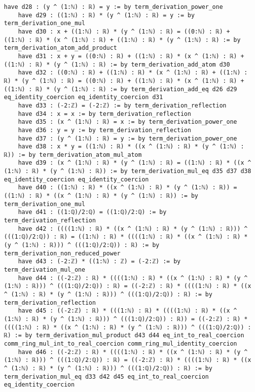 \documentclass{article}
\begin{document}
\begin{tcolorbox}[colback=white!10, width=\linewidth]
\begin{lstlisting}[language=Lean4]
    have d28 : (y ^ (1:ℕ) : ℝ) = y := by term_derivation_power_one
    have d29 : ((1:ℕ) : ℝ) * (y ^ (1:ℕ) : ℝ) = y := by term_derivation_one_mul
    have d30 : x + ((1:ℕ) : ℝ) * (y ^ (1:ℕ) : ℝ) = ((0:ℕ) : ℝ) + ((1:ℕ) : ℝ) * (x ^ (1:ℕ) : ℝ) + ((1:ℕ) : ℝ) * (y ^ (1:ℕ) : ℝ) := by term_derivation_atom_add_product
    have d31 : x + y = ((0:ℕ) : ℝ) + ((1:ℕ) : ℝ) * (x ^ (1:ℕ) : ℝ) + ((1:ℕ) : ℝ) * (y ^ (1:ℕ) : ℝ) := by term_derivation_add_atom d30
    have d32 : ((0:ℕ) : ℝ) + ((1:ℕ) : ℝ) * (x ^ (1:ℕ) : ℝ) + ((1:ℕ) : ℝ) * (y ^ (1:ℕ) : ℝ) = ((0:ℕ) : ℝ) + ((1:ℕ) : ℝ) * (x ^ (1:ℕ) : ℝ) + ((1:ℕ) : ℝ) * (y ^ (1:ℕ) : ℝ) := by term_derivation_add_eq d26 d29 eq_identity_coercion eq_identity_coercion d31
    have d33 : (-2:ℤ) = (-2:ℤ) := by term_derivation_reflection
    have d34 : x = x := by term_derivation_reflection
    have d35 : (x ^ (1:ℕ) : ℝ) = x := by term_derivation_power_one
    have d36 : y = y := by term_derivation_reflection
    have d37 : (y ^ (1:ℕ) : ℝ) = y := by term_derivation_power_one
    have d38 : x * y = ((1:ℕ) : ℝ) * ((x ^ (1:ℕ) : ℝ) * (y ^ (1:ℕ) : ℝ)) := by term_derivation_atom_mul_atom
    have d39 : (x ^ (1:ℕ) : ℝ) * (y ^ (1:ℕ) : ℝ) = ((1:ℕ) : ℝ) * ((x ^ (1:ℕ) : ℝ) * (y ^ (1:ℕ) : ℝ)) := by term_derivation_mul_eq d35 d37 d38 eq_identity_coercion eq_identity_coercion
    have d40 : ((1:ℕ) : ℝ) * ((x ^ (1:ℕ) : ℝ) * (y ^ (1:ℕ) : ℝ)) = ((1:ℕ) : ℝ) * ((x ^ (1:ℕ) : ℝ) * (y ^ (1:ℕ) : ℝ)) := by term_derivation_one_mul
    have d41 : ((1:ℚ)/2:ℚ) = ((1:ℚ)/2:ℚ) := by term_derivation_reflection
    have d42 : ((((1:ℕ) : ℝ) * ((x ^ (1:ℕ) : ℝ) * (y ^ (1:ℕ) : ℝ))) ^ (((1:ℚ)/2:ℚ)) : ℝ) = ((1:ℕ) : ℝ) * ((((1:ℕ) : ℝ) * ((x ^ (1:ℕ) : ℝ) * (y ^ (1:ℕ) : ℝ))) ^ (((1:ℚ)/2:ℚ)) : ℝ) := by term_derivation_non_reduced_power
    have d43 : (-2:ℤ) * ((1:ℕ) : ℤ) = (-2:ℤ) := by term_derivation_mul_one
    have d44 : ((-2:ℤ) : ℝ) * ((((1:ℕ) : ℝ) * ((x ^ (1:ℕ) : ℝ) * (y ^ (1:ℕ) : ℝ))) ^ (((1:ℚ)/2:ℚ)) : ℝ) = ((-2:ℤ) : ℝ) * ((((1:ℕ) : ℝ) * ((x ^ (1:ℕ) : ℝ) * (y ^ (1:ℕ) : ℝ))) ^ (((1:ℚ)/2:ℚ)) : ℝ) := by term_derivation_reflection
    have d45 : ((-2:ℤ) : ℝ) * (((1:ℕ) : ℝ) * ((((1:ℕ) : ℝ) * ((x ^ (1:ℕ) : ℝ) * (y ^ (1:ℕ) : ℝ))) ^ (((1:ℚ)/2:ℚ)) : ℝ)) = ((-2:ℤ) : ℝ) * ((((1:ℕ) : ℝ) * ((x ^ (1:ℕ) : ℝ) * (y ^ (1:ℕ) : ℝ))) ^ (((1:ℚ)/2:ℚ)) : ℝ) := by term_derivation_mul_product d43 d44 eq_int_to_real_coercion comm_ring_mul_int_to_real_coercion comm_ring_mul_identity_coercion
    have d46 : ((-2:ℤ) : ℝ) * ((((1:ℕ) : ℝ) * ((x ^ (1:ℕ) : ℝ) * (y ^ (1:ℕ) : ℝ))) ^ (((1:ℚ)/2:ℚ)) : ℝ) = ((-2:ℤ) : ℝ) * ((((1:ℕ) : ℝ) * ((x ^ (1:ℕ) : ℝ) * (y ^ (1:ℕ) : ℝ))) ^ (((1:ℚ)/2:ℚ)) : ℝ) := by term_derivation_mul_eq d33 d42 d45 eq_int_to_real_coercion eq_identity_coercion

\end{lstlisting}
\end{tcolorbox}
\end{document}
